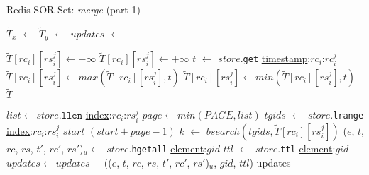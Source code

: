 \begin{algorithm}[b!]
\small{
	\caption{Redis SOR-Set: \textit{merge} (part 1)}
 	\label{alg:merge}

 	\begin{algorithmic}[1]
 	    \State $\tilde{T}_{x}$ $\gets$ 
 	    \State $\tilde{T}_{y}$ $\gets$ 
 	    \State $updates$ $\gets$ 
 	    \State {}
 	    \State {}
 	  \EndProcedure

              \State $\tilde{T}[rc_{i}][rs_{i}^{j}] \gets -\infty$
            \Else
              \State $\tilde{T}[rc_{i}][rs_{i}^{j}] \gets +\infty$
            \EndIf
 	          \State $t$ $\gets$ $store$.\texttt{get} \underline{timestamp}:$rc_{i}$:$rc_{i}^{j}$
                \State $\tilde{T}[rc_{i}][rs_{i}^{j}] \gets max(\tilde{T}[rc_{i}][rs_{i}^{j}], t)$
              \Else
                \State $\tilde{T}[rc_{i}][rs_{i}^{j}] \gets min(\tilde{T}[rc_{i}][rs_{i}^{j}], t)$
              \EndIf
 	        \EndFor
 	      \EndFor
 	    \EndFor
 	    \State \Return $\tilde{T}$
 	  \EndFunction

 	          \State $list \gets store.\texttt{llen}$ \underline{index}:$rc_{i}$:$rs_{i}^{j}$
 	          \State $page \gets min(PAGE, list)$
 	            \State $tgids$ $\gets$ $store$.\texttt{lrange} \underline{index}:$rc_{i}$:$rs_{i}^{j}$ $start$ $(start + page - 1)$
 	            \State $k$ $\gets$ $bsearch(tgids, \tilde{T}[rc_{i}][rs_{i}^{j}])$
 	              \State ($e$, $t$, $rc$, $rs$, $t'$, $rc'$, $rs'$)$_{u} \gets$ $store$.\texttt{hgetall} \underline{element}:$gid$
 	              \State $ttl$ $\gets$ $store$.\texttt{ttl} \underline{element}:$gid$
 	              \State $updates \gets updates$ + (($e$, $t$, $rc$, $rs$, $t'$, $rc'$, $rs'$)$_{u}$, $gid$, $ttl$)
                \EndFor
                  \State \Break
                \EndIf
 	          \EndFor
 	        \EndFor
 	      \EndFor
 	    \EndFor
 	    \State \Return updates
 	  \EndFunction
    \end{algorithmic}
 }
\end{algorithm}

